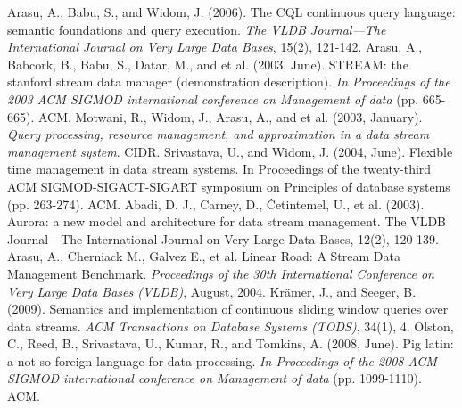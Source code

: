 \documentclass[conference, twocolumn, twoside, 11pt]{IEEEtran}
\theoremstyle{definition}
\begin{document}
%
%
%
\begin{thebibliography}{1}

        Arasu, A., Babu, S., and Widom, J. (2006). The CQL continuous query language: semantic foundations and query execution. \emph{The VLDB Journal—The International Journal on Very Large Data Bases}, 15(2), 121-142.
        Arasu, A., Babcork, B., Babu, S., Datar, M., and et al. (2003, June). STREAM: the stanford stream data manager (demonstration description). \emph{In Proceedings of the 2003 ACM SIGMOD international conference on Management of data} (pp. 665-665). ACM.
        Motwani, R., Widom, J., Arasu, A., and et al. (2003, January). \emph{Query processing, resource management, and approximation in a data stream management system}. CIDR.
        Srivastava, U., and Widom, J. (2004, June). Flexible time management in data stream systems. {In Proceedings of the twenty-third ACM SIGMOD-SIGACT-SIGART symposium on Principles of database systems} (pp. 263-274). ACM.
        Abadi, D. J., Carney, D., {\.C}etintemel, U., et al. (2003). Aurora: a new model and architecture for data stream management. The VLDB Journal—The International Journal on Very Large Data Bases, 12(2), 120-139.
        Arasu, A., Cherniack M., Galvez E., et al. Linear Road: A Stream Data Management Benchmark. \emph{Proceedings of the 30th International Conference on Very Large Data Bases (VLDB)}, August, 2004.
        Kr{\"a}mer, J., and Seeger, B. (2009). Semantics and implementation of continuous sliding window queries over data streams. \emph{ACM Transactions on Database Systems (TODS)}, 34(1), 4.
        Olston, C., Reed, B., Srivastava, U., Kumar, R., and Tomkins, A. (2008, June). Pig latin: a not-so-foreign language for data processing. \emph{In Proceedings of the 2008 ACM SIGMOD international conference on Management of data} (pp. 1099-1110). ACM.

\end{thebibliography}
\end{document}
